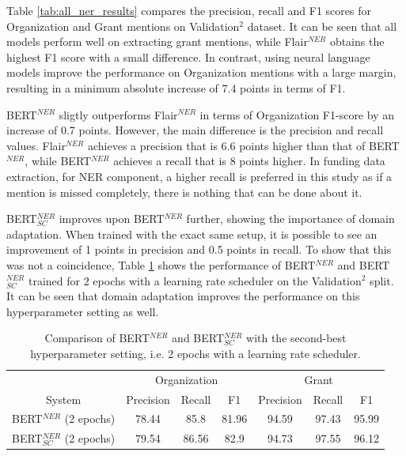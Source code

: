\documentclass{report}
\theoremstyle{definition}
\theoremstyle{remark}
\begin{document}
Table \ref{tab:all_ner_results} compares the precision, recall and F1 scores for Organization and Grant mentions on Validation$^2$ dataset. It can be seen that all models perform well on extracting grant mentions, while Flair$^{NER}$ obtains the highest F1 score with a small difference. In contrast, using neural language models improve the performance on Organization mentions with a large margin, resulting in a minimum absolute increase of 7.4 points in terms of F1.

BERT$^{NER}$ sligtly outperforms Flair$^{NER}$ in terms of Organization F1-score by an increase of 0.7 points. However, the main difference is the precision and recall values. Flair$^{NER}$ achieves a precision that is 6.6 points higher than that of BERT$^{NER}$, while BERT$^{NER}$ achieves a recall that is 8 points higher. In funding data extraction, for NER component, a higher recall is preferred in this study as if a mention is missed completely, there is nothing that can be done about it.

BERT$^{NER}_{SC}$ improves upon BERT$^{NER}$ further, showing the importance of domain adaptation. When trained with the exact same setup, it is possible to see an improvement of 1 points in precision and 0.5 points in recall. To show that this was not a coincidence, Table \ref{tab:bertsccompareother} shows the performance of BERT$^{NER}$ and BERT$^{NER}_{SC}$ trained for 2 epochs with a learning rate scheduler on the Validation$^2$ split. It can be seen that domain adaptation improves the performance on this hyperparameter setting as well.

\begin{table}
    \centering
    \begin{tabular}{c| c c c| c c c}
    &\multicolumn{3}{c|}{Organization}&\multicolumn{3}{c}{Grant} \\
    System&Precision&Recall&F1&Precision&Recall&F1\\
    \hline
    BERT$^{NER}$ (2 epochs) &  78.44&85.8&81.96&94.59&97.43&95.99
 \\[0.7ex]
    BERT$^{NER}_{SC}$ (2 epochs) &  79.54&86.56&82.9&94.73&97.55&96.12
  \\[0.7ex]
    \end{tabular}
    \caption{Comparison of BERT$^{NER}$ and BERT$^{NER}_{SC}$ with the second-best hyperparameter setting, i.e. 2 epochs with a learning rate scheduler.}
    \label{tab:bertsccompareother}
\end{table}
\end{document}
